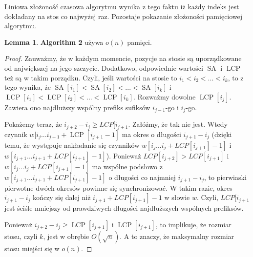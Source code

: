 \documentclass[a4paper,12pt]{article}
\theoremstyle{definition}
\newtheorem{lemma}{Lemma}[section]
\DeclareMathOperator{\SA}{SA}
\DeclareMathOperator{\LCP}{LCP}
\begin{document}
Liniowa złożoność czasowa algorytmu wynika z tego faktu iż każdy indeks jest dokładany na stos co najwyżej raz.
Pozostaje pokazanie złożoności pamięciowej algorytmu.

\begin{lemma}

\textbf{Algorithm 2} używa $o(n)$ pamięci.

\begin{proof}

Zauważmy, że w każdym momencie, pozycje na stosie są uporządkowane od największej na jego szczycie.
Dodatkowo, odpowiednie wartości $\SA$ i $\LCP$ też są w takim porządku.
Czyli, jeśli wartości na stosie to $i_1 < i_2 < ... < i_k$, to z tego wynika,
 że $\SA[i_1] < \SA[i_2] < ... < \SA[i_k]$ i $\LCP[i_1] < \LCP[i_2] < ... < \LCP[i_k]$.
Rozważmy dowolne $\LCP[i_j]$. Zawiera ono najdłuższy wspólny prefiks sufiksów $i_{j-1}$-go i $i_{j}$-go.

Pokażemy teraz, że $i_{j + 2} - i_{j} \geq LCP[i_{j + 1}$.
Załóżmy, że tak nie jest.
Wtedy czynnik $w[i_j ... i_{j + 1} + \LCP[i_{j + 1} - 1]$ ma okres o długości $i_{j + 1} - i_{j}$
 (dzięki temu, że występuje nakładanie się czynników $w[i_{j} ... i_{j} + LCP[i_{j + 1}] - 1]$
  i $w[i_{j + 1} ... i_{j + 1} + LCP[i_{j + 1}] - 1]$).
Ponieważ $LCP[i_{j + 2}] > LCP[i_{j + 1}]$ i $w[i_{j} ... i_{j} + LCP[i_{j + 1}] - 1]$
 ma wspólne podsłowo z $w[i_{j + 1} ... i_{j + 1} + LCP[i_{j + 1}] - 1]$
 o długości co najmniej $i_{j + 1} - i_{j}$,
 to pierwiaski pierwotne dwóch okresów powinne się synchronizować.
W takim razie, okres $i_{j + 1} - i_{j}$ kończy się dalej niż $i_{j + 1} + LCP[i_{j + 1}] - 1$ w słowie $w$.
Czyli, $LCP[i_{j + 1}$ jest ściśle mniejszy od prawdziwych długości najdłuższych wspólnych prefiksów.

Ponieważ $i_{j + 2} - i_{j} \geq \LCP[i_{j + 1}]$ i $\LCP[i_{j + 1}]$, to implikuje,
 że rozmiar stosu, czyli $k$, jest w obrębie $O(\sqrt{n})$.
A to znaczy, że maksymalny rozmiar stosu miejści się w $o(n)$.

\end{proof}
\end{lemma}
\end{document}
